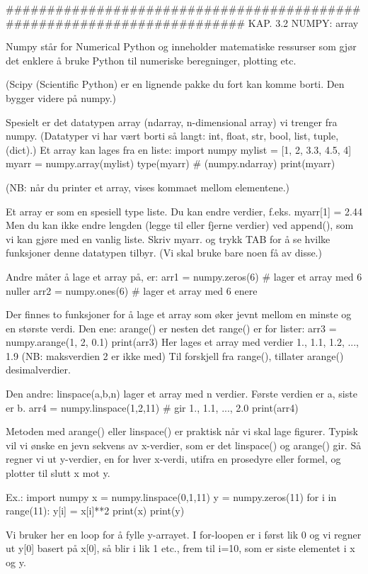 ######################################################################## 
KAP. 3.2  NUMPY: array

Numpy står for Numerical Python og inneholder matematiske ressurser 
som gjør det enklere å bruke Python til numeriske beregninger, plotting etc. 

(Scipy (Scientific Python) er en lignende pakke du fort kan komme borti. 
Den bygger videre på numpy.)

Spesielt er det datatypen array (ndarray, n-dimensional array) vi trenger fra numpy. 
(Datatyper vi har vært borti så langt: int, float, str, bool, list, tuple, (dict).) 
Et array kan lages fra en liste:
import numpy
mylist = [1, 2, 3.3, 4.5, 4] 
myarr = numpy.array(mylist) 
type(myarr)    # (numpy.ndarray)
print(myarr)

(NB: når du printer et array, vises kommaet mellom elementene.)  

Et array er som en spesiell type liste. 
Du kan endre verdier, f.eks.
myarr[1] = 2.44
Men du kan ikke endre lengden (legge til eller fjerne verdier) ved append(), 
som vi kan gjøre med en vanlig liste. 
Skriv myarr. og trykk TAB for å se hvilke funksjoner denne datatypen tilbyr. 
(Vi skal bruke bare noen få av disse.) 


Andre måter å lage et array på, er:
arr1 = numpy.zeros(6)    # lager et array med 6 nuller
arr2 = numpy.ones(6)     # lager et array med 6 enere

Der finnes to funksjoner for å lage et array som øker jevnt mellom en minste og en største verdi. 
Den ene: arange() er nesten det range() er for lister: 
arr3 = numpy.arange(1, 2, 0.1) 
print(arr3)
Her lages et array med verdier 1., 1.1, 1.2, ..., 1.9  (NB: maksverdien 2 er ikke med)
Til forskjell fra range(), tillater arange() desimalverdier. 

Den andre: linspace(a,b,n) lager et array med n verdier. Første verdien er a, siste er b. 
arr4 = numpy.linspace(1,2,11)  # gir 1., 1.1, ..., 2.0  
print(arr4)


Metoden med arange() eller linspace() er praktisk når vi skal lage figurer. 
Typisk vil vi ønske en jevn sekvens av x-verdier, som er det linspace() og arange() gir.  
Så regner vi ut y-verdier, en for hver x-verdi, utifra en prosedyre eller formel, 
og plotter til slutt x mot y. 

Ex.:
import numpy
x = numpy.linspace(0,1,11)
y = numpy.zeros(11)
for i in range(11): 
    y[i] = x[i]**2
print(x)
print(y)

Vi bruker her en loop for å fylle y-arrayet.
I for-loopen er i først lik 0 og vi regner ut y[0] basert på x[0], så blir i lik 1 etc., 
frem til i=10, som er siste elementet i x og y. 

